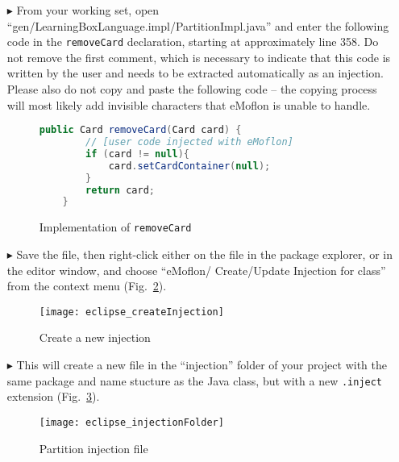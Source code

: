 \begin{itemize}

\item[$\blacktriangleright$] From your working set, open ``gen/LearningBoxLanguage.impl/Part\-it\-ionImpl.java'' and enter the following code in the
\texttt{removeCard} declaration, starting at approximately line 358. Do not remove the first comment, which is necessary to indicate that this code is written
by the user and needs to be extracted automatically as an injection. Please also do not copy and paste the following code -- the copying process will most
likely add invisible characters that eMoflon is unable to handle.

\vspace{0.5cm}

\begin{figure}[htbp]
        \centering
        \begin{lstlisting}[language=Java, keywordstyle={\bfseries\color{purple}}, backgroundcolor=\color{white}]
    public Card removeCard(Card card) {
        // [user code injected with eMoflon]
        if (card != null){
        	card.setCardContainer(null);
        }
        return card;
    }
        \end{lstlisting}
        \caption{Implementation of \texttt{removeCard}}
        \label{code:addToStringRep_impl}
\end{figure}

\vspace{0.5cm}

\item[$\blacktriangleright$] Save the file, then right-click either on the file in the package explorer, or in the editor window, and choose ``eMoflon/
Create/Update Injection for class'' from the context menu (Fig.~\ref{eclipse:injection_create_injection}).

\begin{figure}[htbp]
    \centering
    \texttt{[image: eclipse\_createInjection]}
    \caption{Create a new injection}
    \label{eclipse:injection_create_injection}
\end{figure}

\item[$\blacktriangleright$] This will create a new file in the ``injection'' folder of your project with the same package and name stucture as the Java class,
but with a new \texttt{.inject} extension (Fig.~\ref{eclipse:injection_folder}).

\begin{figure}[htbp]
    \centering
    \texttt{[image: eclipse\_injectionFolder]}
    \caption{Partition injection file}
    \label{eclipse:injection_folder}
\end{figure}


\end{itemize}
